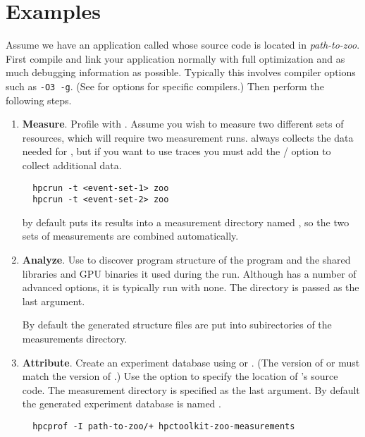 \documentclass[english]{article}
\begin{document}
\section{Examples}

Assume we have an application called  whose source code is located in \emph{path-to-zoo}.
First compile and link your application normally with full optimization
and as much debugging information as possible.
Typically this involves compiler options such as \verb+-O3 -g+.
(See  for options for specific compilers.)
Then perform the following steps.

\begin{enumerate}

\item \textbf{Measure}.
Profile with .
Assume you wish to measure two different sets of resources,
which will require two measurement runs.
 always collects the data needed for ,
but if you want to use traces you must add
the  /  option to collect additional data.
\begin{verbatim}
  hpcrun -t <event-set-1> zoo
  hpcrun -t <event-set-2> zoo
\end{verbatim}

 by default puts its results into a measurement directory
named ,
so the two sets of measurements are combined automatically.

\item \textbf{Analyze}.
Use  to discover program structure of the program
and the shared libraries and GPU binaries it used during the run.
Although  has a number of advanced options, it is typically run with none.
The   directory is passed as the last argument.

By default the generated structure files are put into subirectories of the measurements directory.

\item \textbf{Attribute}.
Create an experiment database using 
or .
(The version of 
or  must match
the version of .)
Use the  option to specify the location of 's source code.
The measurement directory is specified as the last argument.
By default the generated experiment database is named .
\begin{verbatim}
  hpcprof -I path-to-zoo/+ hpctoolkit-zoo-measurements
\end{verbatim}


\end{enumerate}
\end{document}
